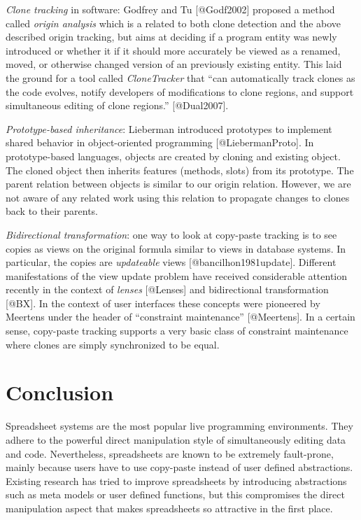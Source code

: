\documentclass[11pt,]{article}
\begin{document}
\emph{Clone tracking} in software: Godfrey and Tu {[}@Godf2002{]}
proposed a method called \emph{origin analysis} which is a related to
both clone detection and the above described origin tracking, but aims
at deciding if a program entity was newly introduced or whether it if it
should more accurately be viewed as a renamed, moved, or otherwise
changed version of an previously existing entity. This laid the ground
for a tool called \emph{CloneTracker} that ``can automatically track
clones as the code evolves, notify developers of modifications to clone
regions, and support simultaneous editing of clone regions.''
{[}@Dual2007{]}.

\emph{Prototype-based inheritance}: Lieberman introduced prototypes to
implement shared behavior in object-oriented programming
{[}@LiebermanProto{]}. In prototype-based languages, objects are created
by cloning and existing object. The cloned object then inherits features
(methods, slots) from its prototype. The parent relation between objects
is similar to our origin relation. However, we are not aware of any
related work using this relation to propagate changes to clones back to
their parents.

\emph{Bidirectional transformation}: one way to look at copy-paste
tracking is to see copies as views on the original formula similar to
views in database systems. In particular, the copies are
\emph{updateable} views {[}@bancilhon1981update{]}. Different
manifestations of the view update problem have received considerable
attention recently in the context of \emph{lenses} {[}@Lenses{]} and
bidirectional transformation {[}@BX{]}. In the context of user
interfaces these concepts were pioneered by Meertens under the header of
``constraint maintenance'' {[}@Meertens{]}. In a certain sense,
copy-paste tracking supports a very basic class of constraint
maintenance where clones are simply synchronized to be equal.

\section{Conclusion}\label{conclusion}

Spreadsheet systems are the most popular live programming environments.
They adhere to the powerful direct manipulation style of simultaneously
editing data and code. Nevertheless, spreadsheets are known to be
extremely fault-prone, mainly because users have to use copy-paste
instead of user defined abstractions. Existing research has tried to
improve spreadsheets by introducing abstractions such as meta models or
user defined functions, but this compromises the direct manipulation
aspect that makes spreadsheets so attractive in the first place.
\end{document}
